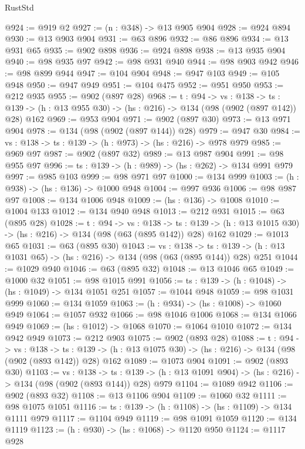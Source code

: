 \begin{lexlean}{RustStd}
\begin{coremodule}
{\begin{coremodule}
{{{{{{{{{@924 := @919 @2
@927 := (n : @348) -> @13 @905 @904
@928 := @924 @894
@930 := @13 @903 @904
@931 := @63 @896
@932 := @86 @896
@934 := @13 @931 @65
@935 := @902 @898
@936 := @924 @898
@938 := @13 @935 @904
@940 := @98 @935 @97
@942 := @98 @931 @940
@944 := @98 @903 @942
@946 := @98 @899 @944
@947 := @104 @904
@948 := @947 @103
@949 := @105 @948
@950 := @947 @949
@951 := @104 @475
@952 := @951 @950
@953 := @212 @935
@955 := @902 (@897 @28)
@968 := {t : @94} ->
  {vs : @138} ->
  {ts : @139} -> (h : @13 @955 @30) -> (hs : @216) -> @134 (@98 (@902 (@897 @142)) @28) @162
@969 := @953 @904
@971 := @902 (@897 @30)
@973 := @13 @971 @904
@978 := @134 (@98 (@902 (@897 @144)) @28)
@979 := @947 @30
@984 := {vs : @138} -> {ts : @139} -> (h : @973) -> (hs : @216) -> @978 @979
@985 := @969 @97
@987 := @902 (@897 @32)
@989 := @13 @987 @904
@991 := @98 @955 @97
@996 := {ts : @139} -> (h : @989) -> (hs : @262) -> @134 @991 @979
@997 := @985 @103
@999 := @98 @971 @97
@1000 := @134 @999
@1003 := (h : @938) -> (hs : @136) -> @1000 @948
@1004 := @997 @936
@1006 := @98 @987 @97
@1008 := @134 @1006 @948
@1009 := (hs : @136) -> @1008
@1010 := @1004 @133
@1012 := @134 @940 @948
@1013 := @212 @931
@1015 := @63 (@895 @28)
@1028 := {t : @94} ->
  {vs : @138} ->
  {ts : @139} -> (h : @13 @1015 @30) -> (hs : @216) -> @134 (@98 (@63 (@895 @142)) @28) @162
@1029 := @1013 @65
@1031 := @63 (@895 @30)
@1043 := {vs : @138} ->
  {ts : @139} -> (h : @13 @1031 @65) -> (hs : @216) -> @134 (@98 (@63 (@895 @144)) @28) @251
@1044 := @1029 @940
@1046 := @63 (@895 @32)
@1048 := @13 @1046 @65
@1049 := @1000 @32
@1051 := @98 @1015 @991
@1056 := {ts : @139} -> (h : @1048) -> (hs : @1049) -> @134 @1051 @251
@1057 := @1044 @948
@1059 := @98 @1031 @999
@1060 := @134 @1059
@1063 := (h : @934) -> (hs : @1008) -> @1060 @949
@1064 := @1057 @932
@1066 := @98 @1046 @1006
@1068 := @134 @1066 @949
@1069 := (hs : @1012) -> @1068
@1070 := @1064 @1010
@1072 := @134 @942 @949
@1073 := @212 @903
@1075 := @902 (@893 @28)
@1088 := {t : @94} ->
  {vs : @138} ->
  {ts : @139} -> (h : @13 @1075 @30) -> (hs : @216) -> @134 (@98 (@902 (@893 @142)) @28) @162
@1089 := @1073 @904
@1091 := @902 (@893 @30)
@1103 := {vs : @138} ->
  {ts : @139} -> (h : @13 @1091 @904) -> (hs : @216) -> @134 (@98 (@902 (@893 @144)) @28) @979
@1104 := @1089 @942
@1106 := @902 (@893 @32)
@1108 := @13 @1106 @904
@1109 := @1060 @32
@1111 := @98 @1075 @1051
@1116 := {ts : @139} -> (h : @1108) -> (hs : @1109) -> @134 @1111 @979
@1117 := @1104 @949
@1119 := @98 @1091 @1059
@1120 := @134 @1119
@1123 := (h : @930) -> (hs : @1068) -> @1120 @950
@1124 := @1117 @928
}}}}}}}}}
\end{coremodule}}
\end{coremodule}
\end{lexlean}
